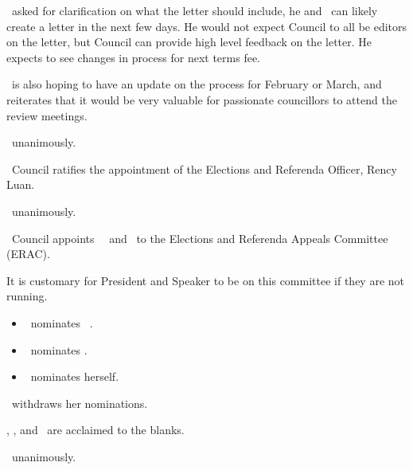 \begin{motion}
\begin{motion}
    \end{motion}

    \andrewc\ asked for clarification on what the letter should include, he
    and \coopcom\ can likely create a letter in the next few days. He would not
    expect Council to all be editors on the letter, but Council can provide
    high level feedback on the letter. He expects to see changes in process for
    next terms fee.

    \andrewc\ is also hoping to have an update on the process for February or
    March, and reiterates that it would be very valuable for passionate 
    councillors to attend the review meetings.

    \carries\ unanimously.
\end{motion}

\begin{motion}
    \birt\ Council ratifies the appointment of the Elections and Referenda
    Officer, Rency Luan.
    \movers{\antonio}{\seneca}

    \carries\ unanimously.
\end{motion}

\begin{motion}
    \birt\ Council appoints \blank\, \blank\, and \blank\ to the Elections and
    Referenda Appeals Committee (ERAC).
    \movers{\antonio}{\seneca}

    It is customary for President and Speaker to be on this committee 
    if they are not running. \begin{itemize}
        \item \andrewc\ nominates \elizabeth\ \antonio. 
        \item \seneca\ nominates \rebecca. 
        \item \nickta\ nominates herself.
    \end{itemize}

    \nickta\ withdraws her nominations. 

    \elizabeth, \antonio, and \rebecca\  are acclaimed to the blanks.

    \carries\ unanimously.
\end{motion}

